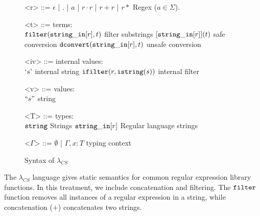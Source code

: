 \documentclass[10pt,preprint]{sigplanconf}
\theoremstyle{definition}
\newcommand{\strin}{{\tt string\_in}}
\newcommand{\str}{ {\tt string} }
\newcommand{\istr}{ {\tt istring} }
\newcommand{\dconvert}[2]{ {\tt dconvert}(#1,#2) }
\newcommand{\filter}[2]{ {\tt filter}(#1,#2) }
\newcommand{\istrf}[1]{`#1\textrm'} %
\newcommand{\strf}[1]{``#1"}
\newcommand{\lcs}{\lambda_{CS}}
\begin{document}
%
%
\begin{figure}
\begin{grammar}
<r> ::= $\epsilon$ | $.$ | $a$ | $r \cdot r$ | $r + r$ | $r*$ \hfill Regex ($a \in \Sigma$).

<t> ::= 			\hfill terms: 					\\
$\filter{\strin[r]}{t}$ 		\hfill filter substrings			\alt
$[\strin[r]](t)$ \hfill safe conversion \alt
$\dconvert{\strin[r]}{t}$ \hfill unsafe conversion

<iv> ::= 			\hfill internal values:					\\
$\istrf{s}$				\hfill internal string \alt
${\tt ifilter}(r, \istr(s))$ \hfill internal filter

<v> ::= \hfill values: \\
$\strf{s}$ \hfill string

<T> ::=				\hfill	types:					\\
$\str$  \hfill Strings \alt
$\strin[r]$				\hfill Regular language strings		

<$\Gamma$> ::=	$\emptyset$	 | $\Gamma,x:T$ \hfill typing context
\end{grammar}
\caption{Syntax of $\lcs$}
\label{fig:lcsSyntax}
\end{figure}

The $\lcs$ language gives static semantics for common regular expression library
functions. In this treatment, we include concatenation and filtering.
The ${\tt filter}$ function removes all instances of a regular expression in a string,
while concatenation ($+$) concatenates two strings.
\end{document}
